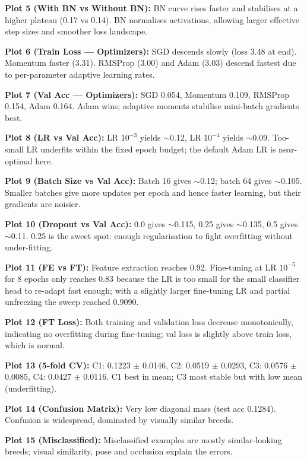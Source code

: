 \documentclass[10pt]{article}
\begin{document}
\textbf{Plot 5 (With BN vs Without BN):} BN curve rises faster and stabilises at a higher plateau (0.17 vs 0.14). BN normalises activations, allowing larger effective step sizes and smoother loss landscape.

\textbf{Plot 6 (Train Loss --- Optimizers):} SGD descends slowly (loss 3.48 at end). Momentum faster (3.31). RMSProp (3.00) and Adam (3.03) descend fastest due to per-parameter adaptive learning rates.

\textbf{Plot 7 (Val Acc --- Optimizers):} SGD 0.054, Momentum 0.109, RMSProp 0.154, Adam 0.164. Adam wins; adaptive moments stabilise mini-batch gradients best.

\textbf{Plot 8 (LR vs Val Acc):} LR $10^{-3}$ yields $\sim$0.12, LR $10^{-4}$ yields $\sim$0.09. Too-small LR underfits within the fixed epoch budget; the default Adam LR is near-optimal here.

\textbf{Plot 9 (Batch Size vs Val Acc):} Batch 16 gives $\sim$0.12; batch 64 gives $\sim$0.105. Smaller batches give more updates per epoch and hence faster learning, but their gradients are noisier.

\textbf{Plot 10 (Dropout vs Val Acc):} 0.0 gives $\sim$0.115, 0.25 gives $\sim$0.135, 0.5 gives $\sim$0.11. 0.25 is the sweet spot: enough regularisation to fight overfitting without under-fitting.

\textbf{Plot 11 (FE vs FT):} Feature extraction reaches 0.92. Fine-tuning at LR $10^{-5}$ for 8 epochs only reaches 0.83 because the LR is too small for the small classifier head to re-adapt fast enough; with a slightly larger fine-tuning LR and partial unfreezing the sweep reached 0.9090.

\textbf{Plot 12 (FT Loss):} Both training and validation loss decrease monotonically, indicating no overfitting during fine-tuning; val loss is slightly above train loss, which is normal.

\textbf{Plot 13 (5-fold CV):} C1: 0.1223 $\pm$ 0.0146, C2: 0.0519 $\pm$ 0.0293, C3: 0.0576 $\pm$ 0.0085, C4: 0.0427 $\pm$ 0.0116. C1 best in mean; C3 most stable but with low mean (underfitting).

\textbf{Plot 14 (Confusion Matrix):} Very low diagonal mass (test acc 0.1284). Confusion is widespread, dominated by visually similar breeds.

\textbf{Plot 15 (Misclassified):} Misclassified examples are mostly similar-looking breeds; visual similarity, pose and occlusion explain the errors.

\end{document}

